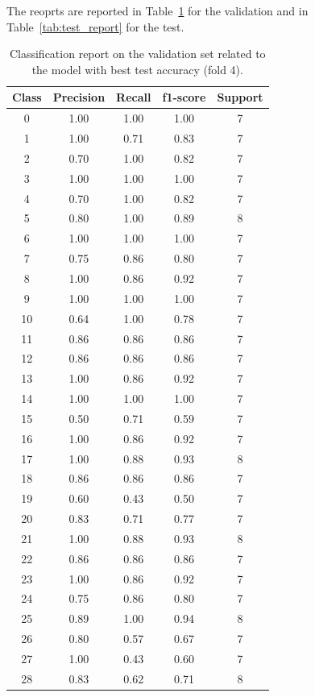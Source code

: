 \documentclass{article}
\begin{document}
\begin{sloppy}
The reoprts are reported in Table~\ref{tab:validation_report}
for the validation and in Table~\ref{tab:test_report} for the test.
\begin{table}[ht]
  \centering
  \caption{Classification report on the validation set related to the model with best test accuracy (fold 4).}
  \label{tab:validation_report}
\begin{tabular}{|c|c|c|c|c|}
  \hline
  Class & Precision & Recall & f1-score & Support \\
  \hline
  0  & 1.00 & 1.00 & 1.00 & 7 \\
  1  & 1.00 & 0.71 & 0.83 & 7 \\
  2  & 0.70 & 1.00 & 0.82 & 7 \\
  3  & 1.00 & 1.00 & 1.00 & 7 \\
  4  & 0.70 & 1.00 & 0.82 & 7 \\
  5  & 0.80 & 1.00 & 0.89 & 8 \\
  6  & 1.00 & 1.00 & 1.00 & 7 \\
  7  & 0.75 & 0.86 & 0.80 & 7 \\
  8  & 1.00 & 0.86 & 0.92 & 7 \\
  9  & 1.00 & 1.00 & 1.00 & 7 \\
  10 & 0.64 & 1.00 & 0.78 & 7 \\
  11 & 0.86 & 0.86 & 0.86 & 7 \\
  12 & 0.86 & 0.86 & 0.86 & 7 \\
  13 & 1.00 & 0.86 & 0.92 & 7 \\
  14 & 1.00 & 1.00 & 1.00 & 7 \\
  15 & 0.50 & 0.71 & 0.59 & 7 \\
  16 & 1.00 & 0.86 & 0.92 & 7 \\
  17 & 1.00 & 0.88 & 0.93 & 8 \\
  18 & 0.86 & 0.86 & 0.86 & 7 \\
  19 & 0.60 & 0.43 & 0.50 & 7 \\
  20 & 0.83 & 0.71 & 0.77 & 7 \\
  21 & 1.00 & 0.88 & 0.93 & 8 \\
  22 & 0.86 & 0.86 & 0.86 & 7 \\
  23 & 1.00 & 0.86 & 0.92 & 7 \\
  24 & 0.75 & 0.86 & 0.80 & 7 \\
  25 & 0.89 & 1.00 & 0.94 & 8 \\
  26 & 0.80 & 0.57 & 0.67 & 7 \\
  27 & 1.00 & 0.43 & 0.60 & 7 \\
  28 & 0.83 & 0.62 & 0.71 & 8 \\

\end{tabular}
\end{table}
\end{sloppy}
\end{document}
